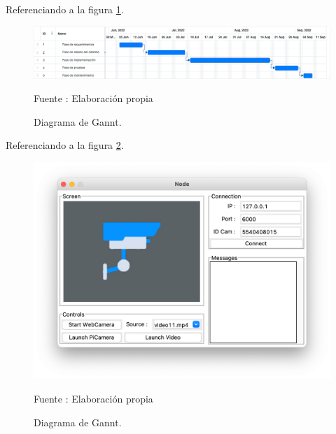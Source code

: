 Referenciando a la figura \ref{fig:gannt}.
\begin{figure}[H]
    \begin{center}
        \includegraphics[width=17cm]{img/capitulo_4/gant.png}
        \caption{Diagrama de Gannt.}
        Fuente : Elaboración propia
        \label{fig:gannt}
    \end{center}
\end{figure}

Referenciando a la figura \ref{fig:camera_screen}.
\begin{figure}[H]
    \begin{center}
        \includegraphics[width=13cm]{img/capitulo_4/camera_screen.png}
        \caption{Diagrama de Gannt.}
        Fuente : Elaboración propia
        \label{fig:camera_screen}
    \end{center}
\end{figure}

